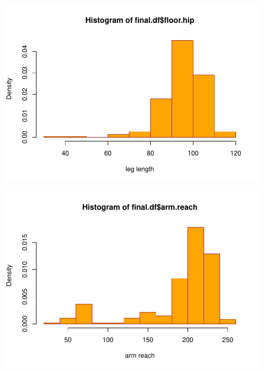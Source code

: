 \documentclass[]{article}
\newenvironment{Shaded}{\begin{snugshade}}{\end{snugshade}}
\newcommand{\DataTypeTok}[1]{\textcolor[rgb]{0.13,0.29,0.53}{#1}}
\newcommand{\KeywordTok}[1]{\textcolor[rgb]{0.13,0.29,0.53}{\textbf{#1}}}
\newcommand{\NormalTok}[1]{#1}
\newcommand{\OperatorTok}[1]{\textcolor[rgb]{0.81,0.36,0.00}{\textbf{#1}}}
\newcommand{\OtherTok}[1]{\textcolor[rgb]{0.56,0.35,0.01}{#1}}
\newcommand{\StringTok}[1]{\textcolor[rgb]{0.31,0.60,0.02}{#1}}
\begin{document}
\includegraphics{project-measure_files/figure-latex/distributions-4.pdf}

\begin{Shaded}
\end{Shaded}

\includegraphics{project-measure_files/figure-latex/distributions-5.pdf}
\end{document}
